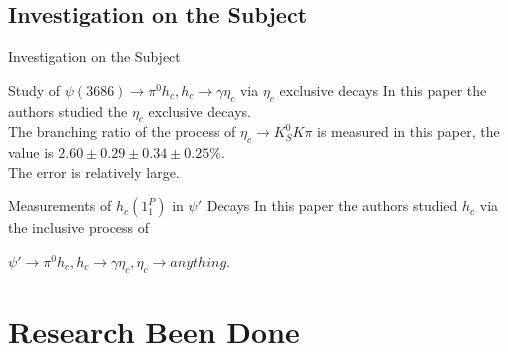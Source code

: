 \documentclass{beamer}
\begin{document}
\subsection{Investigation on the Subject}
\begin{frame}{Investigation on the Subject}
\begin{block}{Study of $\psi(3686)\rightarrow \pi^0h_c, h_c\rightarrow\gamma\eta_c$ via $\eta_c$ exclusive decays} 
In this paper the authors studied the $\eta_c$ exclusive decays.\\
The branching ratio of the process of $\eta_c\rightarrow K^0_S K \pi$ is measured in this paper, the value is $2.60\pm0.29\pm0.34\pm0.25\%$.\\
The error is relatively large.
\end{block}
\begin{block}{Measurements of $h_c(1^P_1)$ in $\psi\prime$ Decays} 
In this paper the authors studied $h_c$ via the inclusive process of\\
        \begin{center}
$\psi\prime\rightarrow\pi^0h_c, h_c\rightarrow\gamma\eta_c, \eta_c\rightarrow anything$.\\
        \end{center}
\end{block}
\end{frame}

\section{Research Been Done}
\end{document}
